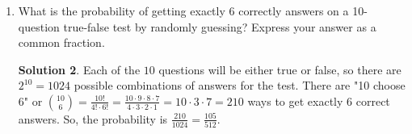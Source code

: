 \documentclass{article}
\theoremstyle{definition}
\newtheorem*{solution}{Solution}
\begin{document}
\begin{enumerate}
\begin{solution}
            be only $720 \div 6 = 120$ seating arrangements. Since we are interested in seating
            arrangements with Andrew and Lindsey seated together, let's imagine that Andrew and
            Lindsey are stuck together and act as a single person. Then we have the same situation
            with five people, so there are $5! \div 5 = 120 \div 5 = 24$ seating arrangements.
            However, we can glue Andrew and Lindsey together in $2$ different ways, so there are
            actually $2 \cdot 24 = 48$ seating arrangements with Andrew and Lindsey seated together.
            Therefore, the probability that they are seated together is $\frac{48}{120} = \frac{2}{5}$.
        \end{solution}
        \item What is the probability of getting exactly $6$ correctly answers on a 10-question
        true-false test by randomly guessing? Express your answer as a common fraction.
        \begin{solution}
            Each of the $10$ questions will be either true or false, so there are $2^{10} = 1024$
            possible combinations of answers for the test. There are "10 choose 6" or ${10 \choose 6}
            = \frac{10!}{4! \cdot 6!} = \frac{10 \cdot 9 \cdot 8 \cdot 7}{4 \cdot 3 \cdot 2 \cdot 1}
            = 10 \cdot 3 \cdot 7= 210$ ways to get exactly $6$ correct answers. So, the probability
            is $\frac{210}{1024} = \frac{105}{512}$.
        \end{solution}
    \end{enumerate}
\end{document}
